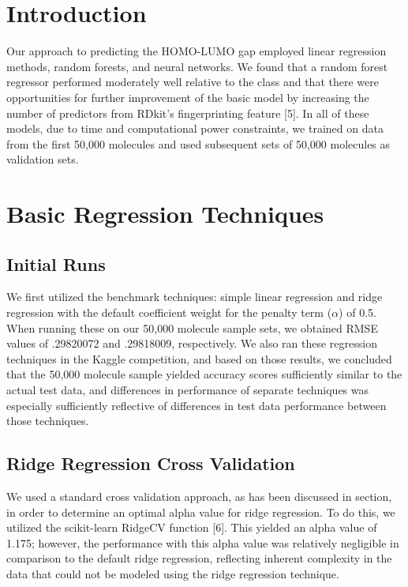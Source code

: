 \documentclass{article}
\begin{document}
\maketitle

\section{Introduction}

Our approach to predicting the HOMO-LUMO gap employed linear regression methods, random forests, and neural networks. We found that a random forest regressor performed moderately well relative to the class and that there were opportunities for further improvement of the basic model by increasing the number of predictors from RDkit's fingerprinting feature [5]. In all of these models, due to time and computational power constraints, we trained on data from the first 50,000 molecules and used subsequent sets of 50,000 molecules as validation sets.

\section{Basic Regression Techniques}

\subsection{Initial Runs}

We first utilized the benchmark techniques: simple linear regression and ridge regression with the default coefficient weight for the penalty term ($\alpha$) of 0.5. When running these on our 50,000 molecule sample sets, we obtained RMSE values of .29820072 and .29818009, respectively. We also ran these regression techniques in the Kaggle competition, and based on those results, we concluded that the 50,000 molecule sample yielded accuracy scores sufficiently similar to the actual test data, and differences in performance of separate techniques was especially sufficiently reflective of differences in test data performance between those techniques.

\subsection{Ridge Regression Cross Validation}

We used a standard cross validation approach, as has been discussed in section, in order to determine an optimal alpha value for ridge regression. To do this, we utilized the scikit-learn RidgeCV function [6]. This yielded an alpha value of 1.175; however, the performance with this alpha value was relatively negligible in comparison to the default ridge regression, reflecting inherent complexity in the data that could not be modeled using the ridge regression technique.
\end{document}
